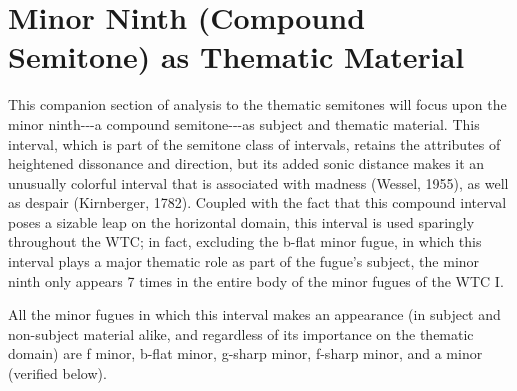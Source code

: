     \section{Minor Ninth (Compound Semitone) as Thematic
Material}\label{minor-ninth-compound-semitone-as-thematic-material}

This companion section of analysis to the thematic semitones will focus
upon the minor ninth-\/-\/-a compound semitone-\/-\/-as subject and
thematic material. This interval, which is part of the semitone class of
intervals, retains the attributes of heightened dissonance and
direction, but its added sonic distance makes it an unusually colorful
interval that is associated with madness (Wessel, 1955), as well as
despair (Kirnberger, 1782). Coupled with the fact that this compound
interval poses a sizable leap on the horizontal domain, this interval is
used sparingly throughout the WTC; in fact, excluding the b-flat minor
fugue, in which this interval plays a major thematic role as part of the
fugue's subject, the minor ninth only appears 7 times in the entire body
of the minor fugues of the WTC I.

All the minor fugues in which this interval makes an appearance (in
subject and non-subject material alike, and regardless of its importance
on the thematic domain) are f minor, b-flat minor, g-sharp minor,
f-sharp minor, and a minor (verified below).

